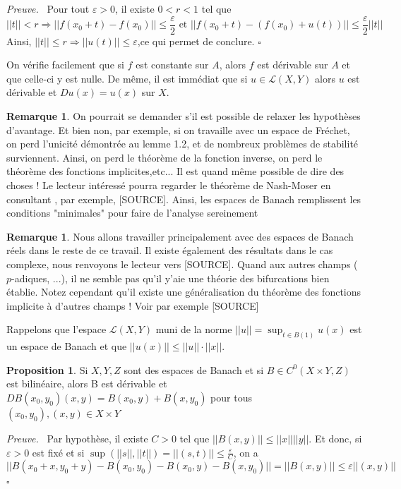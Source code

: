 \documentclass[a4paper,12pt,oneside,titlepage]{article}
\theoremstyle{definition}
\newtheorem{proposition}[definition]{Proposition}
\newtheorem{remarque}[definition]{Remarque}
\theoremstyle{plain}
\newenvironment{preuve}
{\par\noindent\textit{Preuve.}\ }
{\hfill$\square$\par}
\begin{document}
\begin{preuve}
    Pour tout $\varepsilon>0$, il existe $0<r<1$ tel que
    \begin{equation*}
        ||t||<r\Rightarrow ||f(x_0+t) - f(x_0)||\leq 
        \frac{\varepsilon}{2}\text{ et } ||f(x_0+t)-(f(x_0)+u(t))||\leq\frac{\varepsilon}{2} ||t||
    \end{equation*}
Ainsi, $||t||\leq r\Rightarrow ||u(t)||\leq\varepsilon$,ce qui permet de conclure.
\end{preuve}
On vérifie facilement que si $f$ est constante sur $A$, alors $f$ est dérivable sur $A$ et que celle-ci y est nulle. De même, il est immédiat que si $u\in \mathcal{L}(X,Y)$ alors $u$ est dérivable et $Du(x) =u(x)$ sur $X$.
\begin{remarque}
On pourrait se demander s'il est possible de relaxer les hypothèses d'avantage. Et bien non, par exemple, si on travaille avec un espace de Fréchet, on perd l'unicité démontrée au lemme 1.2, et de nombreux problèmes de stabilité surviennent. Ainsi, on perd le théorème de la fonction inverse, on perd le théorème des fonctions implicites,etc... Il est quand même possible de dire des choses ! Le lecteur intéressé pourra regarder le théorème de Nash-Moser en consultant , par exemple, [SOURCE]. Ainsi, les espaces de Banach remplissent les conditions "minimales" pour faire de l'analyse sereinement
\end{remarque}
\begin{remarque}
Nous allons travailler principalement avec des espaces de Banach réels dans le reste de ce travail. Il existe également des résultats dans le cas complexe, nous renvoyons le lecteur vers [SOURCE]. Quand aux autres champs ($p$-adiques, ...), il ne semble pas qu'il y'aie une théorie des bifurcations  bien établie. Notez cependant qu'il existe une généralisation du théorème des fonctions implicite à d'autres champs ! Voir par exemple [SOURCE]
\end{remarque}
Rappelons que l'espace $\mathcal{L}(X,Y)$ muni de la norme $||u||=\sup_{t\in B(1)} u(x)$  est un espace de Banach et que $|| u(x) ||\leq ||u||\cdot||x||$. 

\begin{proposition}
Si $X,Y,Z$ sont des espaces de Banach et si $B\in C^0(X\times Y,Z)$ est 
bilinéaire, alors B est dérivable et $DB(x_0,y_0)(x,y)= B(x_0,y)+B(x,y_0)$ 
pour tous $(x_0,y_0),(x,y)\in X\times Y$
\end{proposition}
\begin{preuve}
     Par hypothèse, il existe $C>0$ tel que $||B(x,y)||\leq ||x|| ||y||$. Et donc, si $\varepsilon>0$ est fixé et si $\sup(||s||,||t||)=||(s,t)||\leq \frac{\varepsilon}{C}$, on a 
     \begin{equation*}
         || B(x_0+x,y_0+y)-B(x_0,y_0)-
         B(x_0,y)-B(x,y_0)||= ||B(x,y)||\leq\varepsilon ||(x,y)||
     \end{equation*}
\end{preuve}
\end{document}
